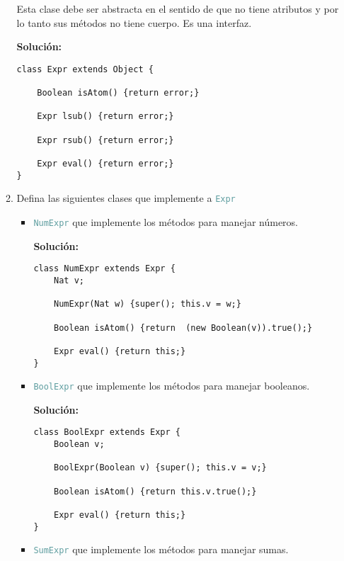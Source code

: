 \documentclass{article}
\newcommand{\tp}[1]{\textcolor{CadetBlue} {\texttt{#1}}}
\newcommand{\tb}[1]{\textcolor{RoyalPurple} {\textbf{#1}}}
\begin{document}
\begin{enumerate}
\begin{enumerate}
            Esta clase debe ser abstracta en el sentido de que no tiene
            atributos y por lo tanto sus métodos no tiene cuerpo. Es una
            interfaz.

            \tb{Solución:}

            \begin{verbatim}
class Expr extends Object {

    Boolean isAtom() {return error;}

    Expr lsub() {return error;}

    Expr rsub() {return error;}

    Expr eval() {return error;}
}
            \end{verbatim}

            \item Defina las siguientes clases que implemente a \tp{Expr}

            \begin{itemize}
                \item \tp{NumExpr} que implemente los métodos para manejar
                números.

                \tb{Solución:}

                \begin{verbatim}
class NumExpr extends Expr {
    Nat v;

    NumExpr(Nat w) {super(); this.v = w;}

    Boolean isAtom() {return  (new Boolean(v)).true();}

    Expr eval() {return this;}
}
                \end{verbatim}

                \item \tp{BoolExpr} que implemente los métodos para manejar
                booleanos.

                \tb{Solución:}

                \begin{verbatim}
class BoolExpr extends Expr {
    Boolean v;

    BoolExpr(Boolean v) {super(); this.v = v;}

    Boolean isAtom() {return this.v.true();}

    Expr eval() {return this;}
}
                \end{verbatim}

                \item \tp{SumExpr} que implemente los métodos para manejar
                sumas.


\end{itemize}
\end{enumerate}
\end{enumerate}
\end{document}
